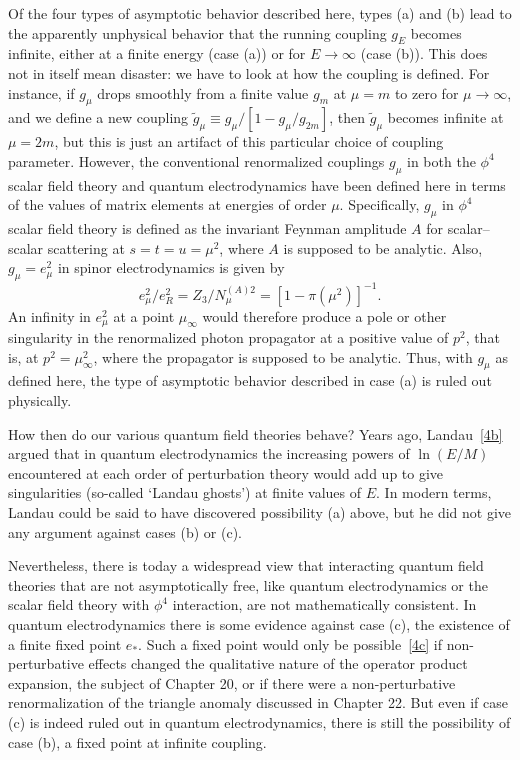 Of the four types of asymptotic behavior described here, types (a) and
(b) lead to the apparently unphysical behavior that the running coupling
$g_E$ becomes infinite, either at a finite energy (case (a)) or for $E\to\infty$
(case (b)). This does not in itself mean disaster: we have to look at how
the coupling is defined. For instance, if $g_\mu$ drops smoothly from a finite
value $g_m$ at $\mu=m$ to zero for $\mu\to\infty$, and we define a new coupling
$\widetilde g_\mu\equiv g_\mu/[1-g_\mu/g_{2m}]$, then $\widetilde g_\mu$ becomes infinite at $\mu=2m$, but this is
just an artifact of this particular choice of coupling parameter. However,
the conventional renormalized couplings $g_\mu$ in both the $\phi^4$ scalar field
theory and quantum electrodynamics have been defined here in terms of
the values of matrix elements at energies of order $\mu$. Specifically, $g_\mu$ in
$\phi^4$ scalar field theory is defined as the invariant Feynman amplitude $A$
for scalar--scalar scattering at $s=t=u=\mu^2$, where $A$ is supposed to be
analytic. Also, $g_\mu=e_\mu^2$ in spinor electrodynamics is given by
\begin{equation}
e_\mu^2/e_R^2=Z_3/N_\mu^{(A)2}=\left[1-\pi(\mu^2)\right]^{-1}.
\label{eq:18.3.28}
\end{equation}
An infinity in $e_\mu^2$ at a point $\mu_\infty$ would therefore produce a pole or other
singularity in the renormalized photon propagator at a positive value of
$p^2$, that is, at $p^2=\mu_\infty^2$, where the propagator is supposed to be analytic.
Thus, with $g_\mu$ as defined here, the type of asymptotic behavior described
in case (a) is ruled out physically.

How then do our various quantum field theories behave? Years ago,
Landau~\hyperref[ch18-ref-4b]{[4b]} argued that in quantum electrodynamics the increasing powers
of $\ln(E/M)$ encountered at each order of perturbation theory would add
up to give singularities (so-called `Landau ghosts') at finite values of $E$.
In modern terms, Landau could be said to have discovered possibility (a)
above, but he did not give any argument against cases (b) or (c).

Nevertheless, there is today a widespread view that interacting quantum
field theories that are not asymptotically free, like quantum electrodynamics
or the scalar field theory with $\phi^4$ interaction, are not mathematically
consistent. In quantum electrodynamics there is some evidence against
case (c), the existence of a finite fixed point $e_*$. Such a fixed point
would only be possible~\hyperref[ch18-ref-4c]{[4c]} if non-perturbative effects changed the qualitative
nature of the operator product expansion, the subject of Chapter 20, or
if there were a non-perturbative renormalization of the triangle anomaly
discussed in Chapter 22. But even if case (c) is indeed ruled out in quantum
electrodynamics, there is still the possibility of case (b), a fixed point
at infinite coupling.

